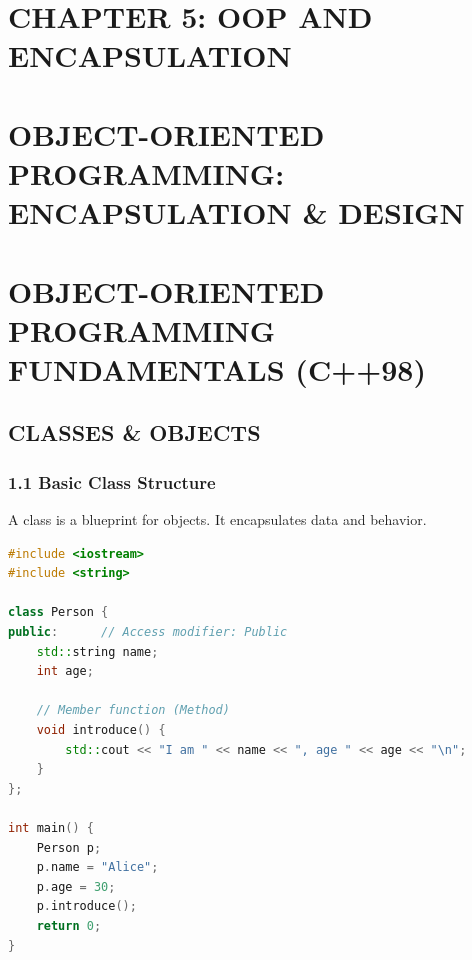 \hypertarget{chapter-5-oop-and-encapsulation}{%
\section{CHAPTER 5: OOP AND
ENCAPSULATION}\label{chapter-5-oop-and-encapsulation}}

\hypertarget{object-oriented-programming-encapsulation-design}{%
\section{OBJECT-ORIENTED PROGRAMMING: ENCAPSULATION \&
DESIGN}\label{object-oriented-programming-encapsulation-design}}

\hypertarget{object-oriented-programming-fundamentals-c98}{%
\section{OBJECT-ORIENTED PROGRAMMING FUNDAMENTALS
(C++98)}\label{object-oriented-programming-fundamentals-c98}}

\hypertarget{classes-objects}{%
\subsection{CLASSES \& OBJECTS}\label{classes-objects}}

\hypertarget{basic-class-structure}{%
\subsubsection{1.1 Basic Class Structure}\label{basic-class-structure}}

A class is a blueprint for objects. It encapsulates data and behavior.

\begin{lstlisting}[language={C++}]
#include <iostream>
#include <string>

class Person {
public:      // Access modifier: Public
    std::string name;
    int age;

    // Member function (Method)
    void introduce() {
        std::cout << "I am " << name << ", age " << age << "\n";
    }
};

int main() {
    Person p;
    p.name = "Alice";
    p.age = 30;
    p.introduce();
    return 0;
}
\end{lstlisting}

